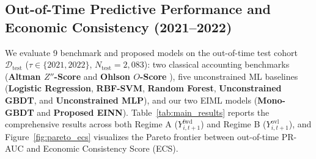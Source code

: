 \documentclass[11pt,a4paper]{article}
\begin{document}
\subsection{Out-of-Time Predictive Performance and Economic Consistency (2021--2022)}
We evaluate 9 benchmark and proposed models on the out-of-time test cohort $\mathcal{D}_{\text{test}}$ ($\tau \in \{2021, 2022\}$, $N_{\text{test}}=2,083$): two classical accounting benchmarks (\textbf{Altman $Z''$-Score} \citep{altman1995emerging} and \textbf{Ohlson $O$-Score} \citep{ohlson1980financial}), five unconstrained ML baselines (\textbf{Logistic Regression}, \textbf{RBF-SVM}, \textbf{Random Forest}, \textbf{Unconstrained GBDT}, and \textbf{Unconstrained MLP}), and our two EIML models (\textbf{Mono-GBDT} and \textbf{Proposed EINN}). Table~\ref{tab:main_results} reports the comprehensive results across both Regime A ($Y_{i,t+1}^{\text{fwd}}$) and Regime B ($Y_{i,t+1}^{\text{ovl}}$), and Figure~\ref{fig:pareto_ecs} visualizes the Pareto frontier between out-of-time PR-AUC and Economic Consistency Score (ECS).
\end{document}
